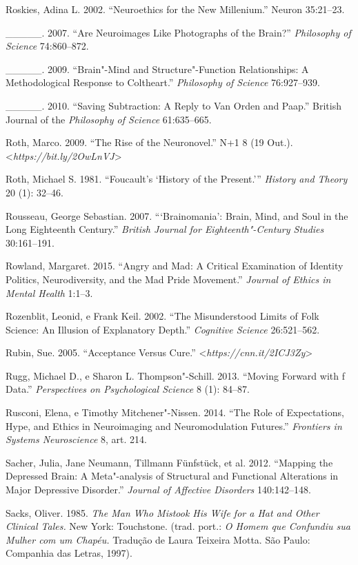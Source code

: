 {\begin{Parskip}
Roskies, Adina L. 2002. ``Neuroethics for the New Millenium.'' Neuron
35:21--23.

\_\_\_\_\_. 2007. ``Are Neuroimages Like Photographs of the Brain?''
\emph{Philosophy of Science} 74:860--872.

\_\_\_\_\_. 2009. ``Brain"-Mind and Structure"-Function Relationships: A
Methodological Response to Coltheart.'' \emph{Philosophy of Science}
76:927--939.

\_\_\_\_\_. 2010. ``Saving Subtraction: A Reply to Van Orden and Paap.''
British Journal of the \emph{Philosophy of Science} 61:635--665.

Roth, Marco. 2009. ``The Rise of the Neuronovel.'' N+1 8 (19 Out.).
\textless{}\emph{https://bit.ly/2OwLnVJ}\textgreater{}

Roth, Michael S. 1981. ``Foucault's `History of the Present.'''
\emph{History and Theory} 20 (1): 32--46.

Rousseau, George Sebastian. 2007. ```Brainomania': Brain, Mind, and Soul
in the Long Eighteenth Century.'' \emph{British Journal for
Eighteenth"-Century Studies} 30:161--191.

Rowland, Margaret. 2015. ``Angry and Mad: A Critical Examination of
Identity Politics, Neurodiversity, and the Mad Pride Movement.''
\emph{Journal of Ethics in Mental Health} 1:1--3.

Rozenblit, Leonid, e Frank Keil. 2002. ``The Misunderstood Limits of
Folk Science: An Illusion of Explanatory Depth.'' \emph{Cognitive
Science} 26:521--562.

Rubin, Sue. 2005. ``Acceptance Versus Cure.''
\textless{}\emph{https://cnn.it/2ICJ3Zy}\textgreater{}

Rugg, Michael D., e Sharon L. Thompson"-Schill. 2013. ``Moving Forward
with f Data.'' \emph{Perspectives on Psychological Science} 8 (1):
84--87.

Rusconi, Elena, e Timothy Mitchener"-Nissen. 2014. ``The Role of
Expectations, Hype, and Ethics in Neuroimaging and Neuromodulation
Futures.'' \emph{Frontiers in Systems Neuroscience} 8, art. 214.

Sacher, Julia, Jane Neumann, Tillmann Fünfstück, et al. 2012. ``Mapping
the Depressed Brain: A Meta"-analysis of Structural and Functional
Alterations in Major Depressive Disorder.'' \emph{Journal of Affective
Disorders} 140:142--148.

Sacks, Oliver. 1985. \emph{The Man Who Mistook His Wife for a Hat and
Other Clinical Tales.} New York: Touchstone. (trad. port.: \emph{O Homem
que Confundiu sua Mulher com um Chapéu.} Tradução de Laura Teixeira
Motta. São Paulo: Companhia das Letras, 1997).


\end{Parskip}}
